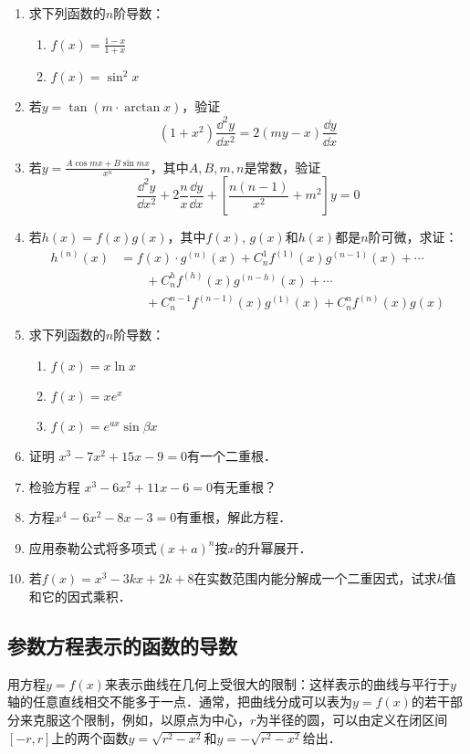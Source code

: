\begin{ex}
\begin{enumerate}
    \item 求下列函数的$n$阶导数：
\begin{multicols}{2}
\begin{enumerate}
    \item $f(x)=\frac{1-x}{1+x}$
    \item $f(x)=\sin^2 x$
\end{enumerate}
\end{multicols}
    \item 若$y=\tan(m\cdot \arctan x)$，验证
\[(1+x^2)\frac{\dd^2 y}{\dd x^2}=2(my-x)\frac{\dd y}{\dd x}\]
\item 若$y=\frac{A\cos mx+B\sin mx}{x^n}$，其中$A,B,m,n$是常数，验证
\[\frac{\dd^2 y}{\dd x^2}+2\frac{n}{x}\frac{\dd y}{\dd x}+\left[\frac{n(n-1)}{x^2}+m^2\right]y=0\]

\item 若$h(x)=f(x)g(x)$，其中$f(x)$, $g(x)$和$h(x)$都是$n$阶可微，求证：
\begin{align*}
    h^{(n)}(x)&=f(x)\cdot g^{(n)}(x)+C^1_n f^{(1)}(x)g^{(n-1)}(x)+\cdots \\
    &\qquad +C^h_n f^{(h)}(x)g^{(n-h)}(x)+\cdots\\
    &\qquad  +C^{n-1}_n f^{(n-1)}(x)g^{(1)}(x)+C^n_n f^{(n)}(x)g(x)
\end{align*}
\item 求下列函数的$n$阶导数：
\begin{multicols}{2}
\begin{enumerate}
\item $f(x)=x\ln x$
\item $f(x)=xe^x$
\item $f(x)=e^{ax}\sin\beta x$
\end{enumerate}
\end{multicols}
\item 证明 $x^3-7x^2+15x-9=0$有一个二重根．
\item 检验方程 $x^3-6x^2+11x-6=0$有无重根？
\item 方程$x^4-6x^2-8x-3=0$有重根，解此方程．
\item 应用泰勒公式将多项式$(x+a)^n$按$x$的升幂展开．
\item 若$f(x)=x^3-3kx+2k+8$在实数范围内能分解成一个二重因式，试求$k$值和它的因式乘积．
\end{enumerate}   
\end{ex}

\subsection{参数方程表示的函数的导数}
用方程$y=f(x)$来表示曲线在几何上受很大的限制：这样表示的曲线与平行于$y$轴的任意直线相交不能多于一点．通常，把曲线分成可以表为$y=f(x)$的若干部分来克服这个限制，例如，以原点为中心，$r$为半径的圆，可以由定义在闭区间$[-r,r]$上的两个函数$y=\sqrt{r^2-x^2}$和$y=-\sqrt{r^2-x^2}$给出．

